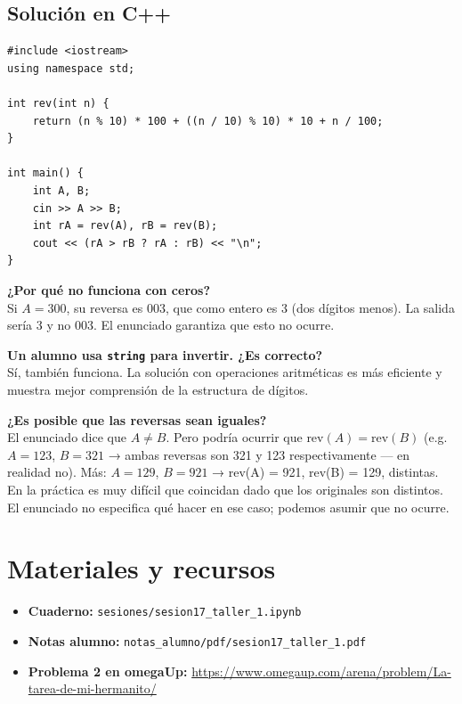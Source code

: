 \documentclass[12pt, oneside]{article}
\begin{document}
\subsection{Solución en C++}

\begin{verbatim}
#include <iostream>
using namespace std;

int rev(int n) {
    return (n % 10) * 100 + ((n / 10) % 10) * 10 + n / 100;
}

int main() {
    int A, B;
    cin >> A >> B;
    int rA = rev(A), rB = rev(B);
    cout << (rA > rB ? rA : rB) << "\n";
}
\end{verbatim}

\begin{notaprofesor}
  \textbf{¿Por qué no funciona con ceros?}\\
  Si $A = 300$, su reversa es 003, que como entero es 3 (dos dígitos menos).
  La salida sería 3 y no 003.  El enunciado garantiza que esto no ocurre.

  \medskip
  \textbf{Un alumno usa \texttt{string} para invertir.  ¿Es correcto?}\\
  Sí, también funciona.  La solución con operaciones aritméticas es más
  eficiente y muestra mejor comprensión de la estructura de dígitos.

  \medskip
  \textbf{¿Es posible que las reversas sean iguales?}\\
  El enunciado dice que $A \neq B$.  Pero podría ocurrir que
  $\text{rev}(A) = \text{rev}(B)$ (e.g.\ $A = 123$, $B = 321$ →
  ambas reversas son 321 y 123 respectivamente — en realidad no).
  Más: $A = 129$, $B = 921$ → rev(A) = 921, rev(B) = 129, distintas.
  En la práctica es muy difícil que coincidan dado que los originales son
  distintos.  El enunciado no especifica qué hacer en ese caso; podemos
  asumir que no ocurre.
\end{notaprofesor}

\newpage

\section{Materiales y recursos}

\begin{itemize}
  \item \textbf{Cuaderno:} \texttt{sesiones/sesion17\_taller\_1.ipynb}
  \item \textbf{Notas alumno:} \texttt{notas\_alumno/pdf/sesion17\_taller\_1.pdf}
  \item \textbf{Problema 2 en omegaUp:}
        \url{https://www.omegaup.com/arena/problem/La-tarea-de-mi-hermanito/}
\end{itemize}
\end{document}
